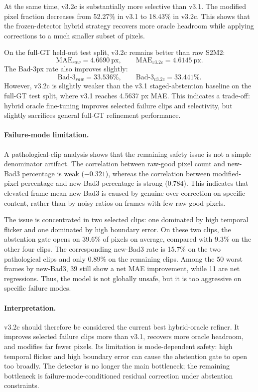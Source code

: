\documentclass[11pt,a4paper]{article}
\begin{document}
At the same time, v3.2c is substantially more selective than v3.1. The modified
pixel fraction decreases from 52.27\% in v3.1 to 18.43\% in v3.2c. This shows
that the frozen-detector hybrid strategy recovers more oracle headroom while
applying corrections to a much smaller subset of pixels.

On the full-GT held-out test split, v3.2c remains better than raw S2M2:
\[
\mathrm{MAE}_{raw} = 4.6690~\mathrm{px},
\qquad
\mathrm{MAE}_{v3.2c} = 4.6145~\mathrm{px}.
\]
The Bad-3px rate also improves slightly:
\[
\mathrm{Bad}\text{-}3_{raw} = 33.536\%,
\qquad
\mathrm{Bad}\text{-}3_{v3.2c} = 33.441\%.
\]
However, v3.2c is slightly weaker than the v3.1 staged-abstention baseline on
the full-GT test split, where v3.1 reaches 4.5637 px MAE. This indicates a
trade-off: hybrid oracle fine-tuning improves selected failure clips and
selectivity, but slightly sacrifices general full-GT refinement performance.

\paragraph{Failure-mode limitation.}
A pathological-clip analysis shows that the remaining safety issue is not a
simple denominator artifact. The correlation between raw-good pixel count and
new-Bad3 percentage is weak (\(-0.321\)), whereas the correlation between
modified-pixel percentage and new-Bad3 percentage is strong (\(0.784\)). This
indicates that elevated frame-mean new-Bad3 is caused by genuine over-correction
on specific content, rather than by noisy ratios on frames with few raw-good
pixels.

The issue is concentrated in two selected clips: one dominated by high temporal
flicker and one dominated by high boundary error. On these two clips, the
abstention gate opens on 39.6\% of pixels on average, compared with 9.3\% on the
other four clips. The corresponding new-Bad3 rate is 15.7\% on the two
pathological clips and only 0.89\% on the remaining clips. Among the 50 worst
frames by new-Bad3, 39 still show a net MAE improvement, while 11 are net
regressions. Thus, the model is not globally unsafe, but it is too aggressive on
specific failure modes.

\paragraph{Interpretation.}
v3.2c should therefore be considered the current best hybrid-oracle refiner. It
improves selected failure clips more than v3.1, recovers more oracle headroom,
and modifies far fewer pixels. Its limitation is mode-dependent safety: high
temporal flicker and high boundary error can cause the abstention gate to open
too broadly. The detector is no longer the main bottleneck; the remaining
bottleneck is failure-mode-conditioned residual correction under abstention
constraints.
\end{document}
